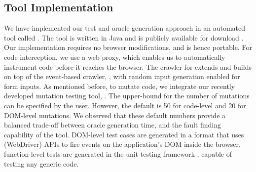 \subsection{Tool Implementation} \label{Sec:tool}
We have implemented our \javascript test and oracle generation approach in an automated tool called \tool. The tool is written in Java and is publicly available for download \cite{jseft-dl}. Our implementation requires no browser modifications, and is hence portable. For \javascript code interception, we use a web proxy, which enables us to automatically instrument \javascript code before it reaches the browser. 
The crawler for \tool extends and builds on top of the  event-based crawler, \crawljax \cite{mesbah:tweb11}, with random input generation enabled for  form inputs.
%
As mentioned before, to mutate \javascript code, we integrate our recently developed mutation testing tool, \mutandis \cite{mirshokraie:icst13}. The upper-bound for the number of mutations can be specified by the 
user. However, the default is 50 for code-level and 20 for DOM-level mutations. We observed that these default numbers  provide a balanced trade-off between oracle generation time, and the fault finding capability of the tool. %
%
DOM-level test cases are generated in a \junit format that uses \selenium (WebDriver) APIs to fire events on the application's DOM inside the browser. \javascript function-level tests are generated in the \qunit unit testing framework \cite{quint}, capable of testing any generic \javascript code. 

